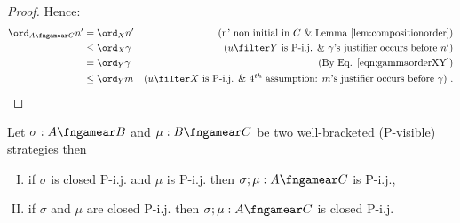 \begin{proof}
Hence:
\begin{align*}
\ord_{A\fngamear C} n' 
& = \ord_{X} n' & \mbox{(n' non initial in $C$ \& Lemma \ref{lem:compositionorder})} \\
& \leq \ord_{X} \gamma & \mbox{($u\filter Y$ is P-i.j. \& $\gamma$'s justifier occurs before $n'$)} \\
& = \ord_{Y} \gamma & \mbox{(By Eq. \ref{eqn:gammaorderXY})} \\
& \leq \ord_{Y} m & \mbox{($u\filter X$ is P-i.j. \& 
4$^{th}$ assumption: $m$'s justifier occurs before $\gamma$)} \ . 
\end{align*}
\end{proof}


\begin{proposition}
\label{prop:pijcompose_when_orda_geq_ordb}
Let $\sigma : A \fngamear B$ and $\mu : B \fngamear C$
be two well-bracketed (P-visible) strategies then
\begin{enumerate}[(I)]
\item if $\sigma$ is closed P-i.j. and $\mu$ is P-i.j.
then $\sigma ; \mu : A \fngamear C$ is P-i.j.,
\item if $\sigma$ and $\mu$ are closed P-i.j.
then $\sigma ; \mu : A \fngamear C$ is closed P-i.j.
\end{enumerate}
\end{proposition}

